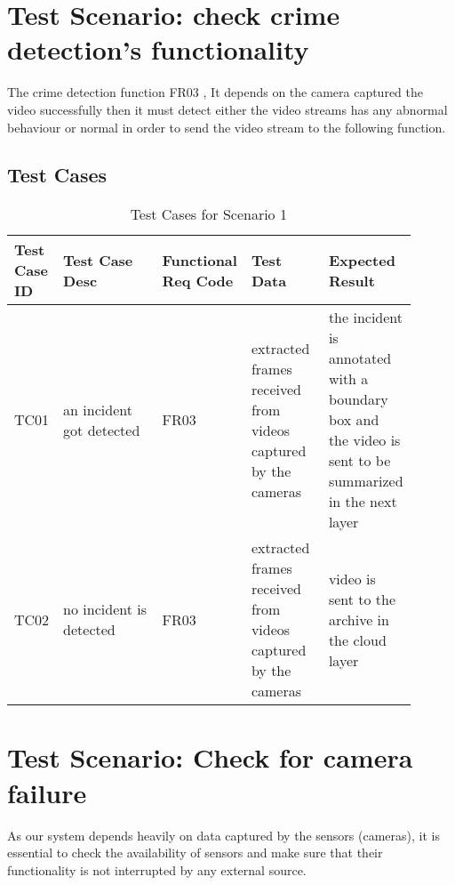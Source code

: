 \documentclass[12pt]{article}
\begin{document}
\section{Test Scenario: check crime detection's functionality}\label{sec:TSx}

The crime detection function FR03 , It depends on the camera captured the video successfully then it must detect either the video streams has any abnormal behaviour or normal in order to send the video stream to the following function.  
\subsection{Test Cases}
\begin{table}[h]
\caption{Test Cases for Scenario 1}
\label{tab:TC1}
\begin{tabular}{|p{0.1\linewidth}|p{0.3\linewidth}|p{0.1\linewidth}|p{0.2\linewidth}|p{0.2\linewidth}|}
\hline
Test Case ID & Test Case Desc & Functional Req Code & Test Data & Expected Result \\ \hline
TC01  & an incident got detected & FR03 &  extracted frames received from videos captured by the cameras  & the incident is annotated with a boundary box and the video is sent to be summarized in the next layer           \\ \hline
TC02 & no incident is detected   & FR03    &  extracted frames received from videos captured by the cameras     & video is sent to the archive in the cloud layer           \\ \hline

\end{tabular}
\end{table}
\newpage
\section{Test Scenario: Check for camera failure}\label{sec:TSy}
As our system depends heavily on data captured by the sensors (cameras), it is essential to check the availability of sensors and make sure that their functionality is not interrupted by any external source.
\end{document}
